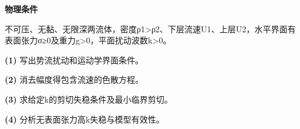 \textbf{物理条件}\par 不可压、无黏、无限深两流体，密度ρ1>ρ2、下层流速U1、上层U2，水平界面有表面张力σ≥0及重力g>0，平面扰动波数k>0。
\par\noindent\textbf{(1)} 写出势流扰动和运动学界面条件。
\par\noindent\textbf{(2)} 消去幅度得包含流速的色散方程。
\par\noindent\textbf{(3)} 求给定k的剪切失稳条件及最小临界剪切。
\par\noindent\textbf{(4)} 分析无表面张力高k失稳与模型有效性。
